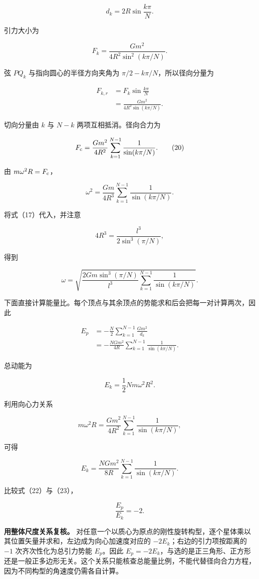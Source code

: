 \documentclass[12pt,a4paper,UTF8]{ctexart}
\begin{document}
\[
d_k=2R\sin\frac{k\pi}{N}.
\tag{18}
\]

引力大小为

\[
F_k=\frac{Gm^2}{4R^2\sin^2(k\pi/N)}.
\]

弦 \(PQ_k\) 与指向圆心的半径方向夹角为 \(\pi/2-k\pi/N\)，所以径向分量为

\[
\begin{aligned}
F_{k,r}
&=F_k\sin\frac{k\pi}{N}\\
&=\frac{Gm^2}{4R^2\sin(k\pi/N)}.
\end{aligned}
\tag{19}
\]

切向分量由 \(k\) 与 \(N-k\) 两项互相抵消。径向合力为

\[
F_{\rm c}
=\frac{Gm^2}{4R^2}
\sum_{k=1}^{N-1}\frac1{\sin(k\pi/N)}.
\tag{20}
\]

由 \(m\omega^2R=F_{\rm c}\)，

\[
\omega^2
=\frac{Gm}{4R^3}
\sum_{k=1}^{N-1}\frac1{\sin(k\pi/N)}.
\]

将式（17）代入，并注意

\[
4R^3=\frac{l^3}{2\sin^3(\pi/N)},
\]

得到

\[
\boxed{
\omega=
\sqrt{
\frac{2Gm\sin^3(\pi/N)}{l^3}
\sum_{k=1}^{N-1}\frac1{\sin(k\pi/N)}
}
}.
\tag{21}
\]

下面直接计算能量比。每个顶点与其余顶点的势能求和后会把每一对计算两次，因此

\[
\begin{aligned}
E_p
&=-\frac{N}{2}\sum_{k=1}^{N-1}\frac{Gm^2}{d_k}\\
&=-\frac{NGm^2}{4R}
\sum_{k=1}^{N-1}\frac1{\sin(k\pi/N)}.
\end{aligned}
\tag{22}
\]

总动能为

\[
E_k=\frac12Nm\omega^2R^2.
\]

利用向心力关系

\[
m\omega^2R
=\frac{Gm^2}{4R^2}\sum_{k=1}^{N-1}\frac1{\sin(k\pi/N)},
\]

可得

\[
E_k
=\frac{NGm^2}{8R}
\sum_{k=1}^{N-1}\frac1{\sin(k\pi/N)}.
\tag{23}
\]

比较式（22）与（23），

\[
\boxed{\frac{E_p}{E_k}=-2}.
\tag{24}
\]

\textbf{用整体尺度关系复核。}
对任意一个以质心为原点的刚性旋转构型，逐个星体乘以其位置矢量并求和，左边成为向心加速度对应的
\(-2E_k\)；右边的引力项按距离的 \(-1\) 次齐次性化为总引力势能
\(E_p\)。因此
\(E_p=-2E_k\)，与选的是正三角形、正方形还是一般正多边形无关。这个关系只能核查总能量比例，不能代替径向合力方程，因为不同构型的角速度仍需各自计算。
\end{document}

